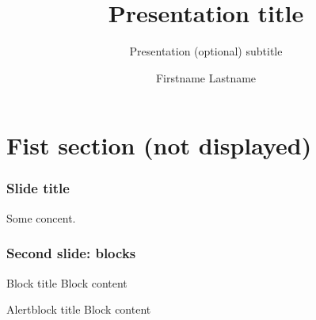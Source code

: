 \documentclass[11pt, xcolor={dvipsnames}]{beamer} %
\title[short title]{Presentation title}
\subtitle[]{Presentation (optional) subtitle}
\author[F. Lastname]{Firstname Lastname}
\begin{document}
\begin{frame}[plain]
\maketitle
\end{frame}



\section{Fist section (not displayed)}



\begin{frame}
 \frametitle{Slide title}
 
Some concent.

\end{frame}


\begin{frame}
 \frametitle{Second slide: blocks}


\begin{block}{Block title}
 Block content
\end{block}

\begin{alertblock}{Alertblock title}
 Block content
\end{alertblock}

\end{frame}
\end{document}
